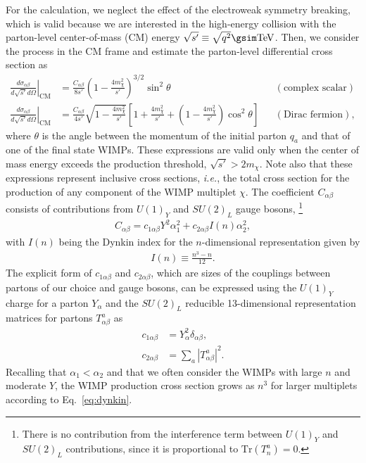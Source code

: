 \documentclass[12pt,twoside,book]{article}
\begin{document}
For the calculation, we neglect the effect of the electroweak symmetry breaking, which is valid because we are interested in the high-energy collision with the parton-level center-of-mass (CM) energy $\sqrt{s'} \equiv \sqrt{q^2} \gsim \mathrm{TeV}$.
Then, we consider the process in the CM frame and estimate the parton-level differential cross section as
\begin{align}
  \left. \frac{d \sigma_{\alpha \beta}}{d \sqrt{s'} d \Omega} \right|_{\text{CM}}
  &= \frac{C_{\alpha \beta}}{8 s'} \left( 1 - \frac{4 m_\chi^2}{s'} \right)^{3/2} \sin^2 \theta
  & &(\text{complex scalar}) \label{eq:parton_cross_section_scalar} \\
  \left. \frac{d \sigma_{\alpha \beta}}{d \sqrt{s'} d \Omega} \right|_{\text{CM}}
  &= \frac{C_{\alpha \beta}}{4 s'} \sqrt{1 - \frac{4 m_\chi^2}{s'}}
  \left[ 1 + \frac{4 m_\chi^2}{s'} + \left( 1 - \frac{4 m_\chi^2}{s'} \right) \cos^2 \theta \right]
  & &(\text{Dirac fermion}), \label{eq:parton_cross_section_fermion}
\end{align}
where $\theta$ is the angle between the momentum of the initial parton $q_a$ and that of one of the final state WIMPs.
These expressions are valid only when the center of mass energy exceeds the production threshold, $\sqrt{s'} > 2m_\chi$.
Note also that these expressions represent inclusive cross sections, \textit{i.e.}, the total cross section for the production of any component of the WIMP multiplet $\chi$.
The coefficient $C_{\alpha \beta}$ consists of contributions from $U(1)_Y$ and $SU(2)_L$ gauge bosons,
\footnote{
  There is no contribution from the interference term between $U(1)_Y$ and $SU(2)_L$ contributions, since it is proportional to $\mathrm{Tr} (T^a_n) = 0$.
}
\begin{align}
  C_{\alpha \beta} = c_{1 \alpha \beta} Y^2 \alpha_1^2
  + c_{2 \alpha \beta} I(n) \alpha_2^2,
\end{align}
with $I(n)$ being the Dynkin index for the $n$-dimensional representation given by
\begin{align}
  I(n) \equiv \frac{n^3-n}{12}.
  \label{eq:dynkin}
\end{align}
The explicit form of $c_{1 \alpha \beta}$ and $c_{2 \alpha \beta}$, which are sizes of the couplings between partons of our choice and gauge bosons, can be expressed using the $U(1)_Y$ charge for a parton $Y_\alpha$ and the $SU(2)_L$ reducible 13-dimensional representation matrices for partons $T^a_{\alpha \beta}$ as
\begin{align}
  c_{1 \alpha \beta} &= Y_\alpha^2 \delta_{\alpha \beta},\\
  c_{2 \alpha \beta} &= \sum_a \left| T^a_{\alpha \beta} \right|^2.
\end{align}
Recalling that $\alpha_1 < \alpha_2$ and that we often consider the WIMPs with large $n$ and moderate $Y$, the WIMP production cross section grows as $n^3$ for larger multiplets according to Eq.~\eqref{eq:dynkin}.
\end{document}

